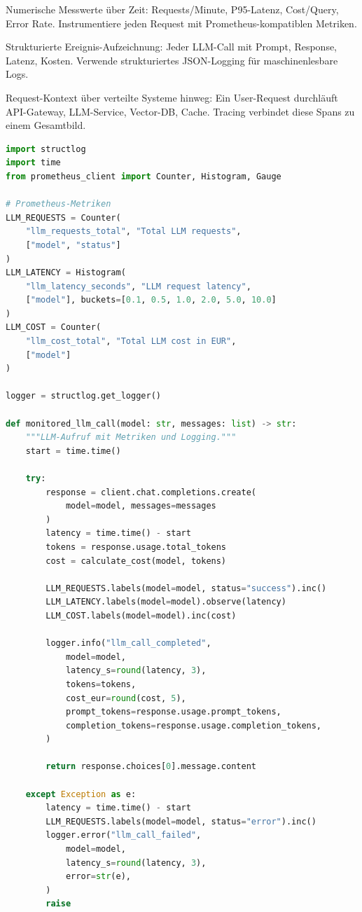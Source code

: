 \begin{description}[leftmargin=*,style=nextline]
    \item[Metriken] Numerische Messwerte über Zeit: Requests/Minute, P95-Latenz, Cost/Query, Error Rate. Instrumentiere jeden Request mit Prometheus-kompatiblen Metriken.
    \item[Logging] Strukturierte Ereignis-Aufzeichnung: Jeder LLM-Call mit Prompt, Response, Latenz, Kosten. Verwende strukturiertes JSON-Logging für maschinenlesbare Logs.
    \item[Tracing] Request-Kontext über verteilte Systeme hinweg: Ein User-Request durchläuft API-Gateway, LLM-Service, Vector-DB, Cache. Tracing verbindet diese Spans zu einem Gesamtbild.
\end{description}

\begin{lstlisting}[language=Python, caption=Strukturiertes Logging mit Metriken für Prometheus]
import structlog
import time
from prometheus_client import Counter, Histogram, Gauge

# Prometheus-Metriken
LLM_REQUESTS = Counter(
    "llm_requests_total", "Total LLM requests",
    ["model", "status"]
)
LLM_LATENCY = Histogram(
    "llm_latency_seconds", "LLM request latency",
    ["model"], buckets=[0.1, 0.5, 1.0, 2.0, 5.0, 10.0]
)
LLM_COST = Counter(
    "llm_cost_total", "Total LLM cost in EUR",
    ["model"]
)

logger = structlog.get_logger()

def monitored_llm_call(model: str, messages: list) -> str:
    """LLM-Aufruf mit Metriken und Logging."""
    start = time.time()

    try:
        response = client.chat.completions.create(
            model=model, messages=messages
        )
        latency = time.time() - start
        tokens = response.usage.total_tokens
        cost = calculate_cost(model, tokens)

        LLM_REQUESTS.labels(model=model, status="success").inc()
        LLM_LATENCY.labels(model=model).observe(latency)
        LLM_COST.labels(model=model).inc(cost)

        logger.info("llm_call_completed",
            model=model,
            latency_s=round(latency, 3),
            tokens=tokens,
            cost_eur=round(cost, 5),
            prompt_tokens=response.usage.prompt_tokens,
            completion_tokens=response.usage.completion_tokens,
        )

        return response.choices[0].message.content

    except Exception as e:
        latency = time.time() - start
        LLM_REQUESTS.labels(model=model, status="error").inc()
        logger.error("llm_call_failed",
            model=model,
            latency_s=round(latency, 3),
            error=str(e),
        )
        raise
\end{lstlisting}

